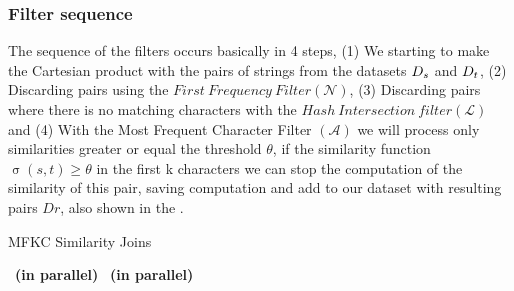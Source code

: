 
\subsubsection{Filter sequence}

The sequence of the filters occurs basically in 4 steps, (1) We starting to make the Cartesian product with the pairs of strings from the datasets ${D_s}{}$ and ${D_t}{}$, (2) Discarding pairs using the $First~Frequency~Filter(\mathcal{N})$, (3) Discarding pairs where there is no matching characters with the $Hash~Intersection~filter (\mathcal{L})$ and (4) With the Most Frequent Character Filter $(\mathcal{A})$ we will process only similarities greater or equal the threshold $\theta$, if the similarity function $\upsigma(s,t) \geq \theta$ in the first k characters we can stop the computation of the similarity of this pair, saving computation and add to our dataset with resulting pairs $Dr$, also shown in the .


\begin{algorithm}[htb] 
	\caption{MFKC Similarity Joins}
	\label{alg:1}
	\begin{multicols}{2}
		\begin{algorithmic}[1]
            ~\textbf{(in parallel)}
			~\textbf{(in parallel)}
			
			\EndIf
			
			\EndIf
			\EndIf
			\EndIf
			\EndFor	
			\EndFor	
			\EndFor		
			\EndProcedure
		\end{algorithmic}
	\end{multicols}
\end{algorithm}

